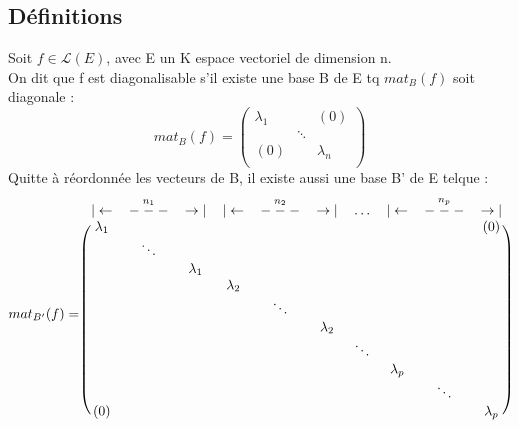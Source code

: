 \subsection{Définitions}
\begin{de}
Soit $f \in \mathcal{L}(E)$, avec E un K espace vectoriel de dimension n.\\
On dit que f est diagonalisable s'il existe une base B de E tq $mat_B(f)$ soit diagonale : 
\[ mat_B(f) = \begin{pmatrix}
  \lambda_1 &  & (0) \\
   & \ddots &  \\
  (0)&  & \lambda_n \\

\end{pmatrix}
\]
Quitte à réordonnée les vecteurs de B, il existe aussi une base B' de E telque : 
\[mat_{B'}(f) = \begin{blockarray}{cccccccccc}
        | \leftarrow & -\overset{n_1}-- &\rightarrow | & | \leftarrow & -\overset{n_2}-- &\rightarrow|& \dots  & |\leftarrow & -\overset{n_p}-- & \rightarrow| \\
        \begin{block}{(cccccccccc)}
           \lambda_1 &  &  & & & & & & & (0) \\
   	   & \ddots & & & & & & & \\
  	   &  & \lambda_1 & &  & & & & &\\
  	   &  &  & \lambda_2 & & & & & & \\
  	   &  &  &  & \ddots & & & & &\\
 	   &  &  &  & & \lambda_2 & & & & \\
 	   &  &  &  & &  & \ddots & & &\\
 	   &  &  &  & &  &  & \lambda_p & &\\
 	   &  &  &  & &  & & & \ddots &\\
  	  (0) &  &  &  & &  &  & & & \lambda_p\\
        \end{block}
        \end{blockarray}
\]


\end{de}
